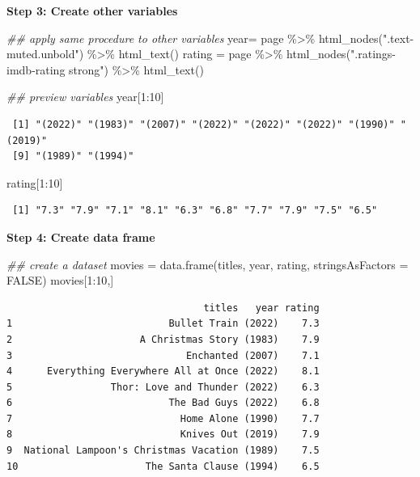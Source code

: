 \documentclass[
  letterpaper,
  DIV=11,
  numbers=noendperiod]{scrreprt}
\newenvironment{Shaded}{\begin{snugshade}}{\end{snugshade}}
\newcommand{\AttributeTok}[1]{\textcolor[rgb]{0.40,0.45,0.13}{#1}}
\newcommand{\ConstantTok}[1]{\textcolor[rgb]{0.56,0.35,0.01}{#1}}
\newcommand{\DecValTok}[1]{\textcolor[rgb]{0.68,0.00,0.00}{#1}}
\newcommand{\DocumentationTok}[1]{\textcolor[rgb]{0.37,0.37,0.37}{\textit{#1}}}
\newcommand{\FunctionTok}[1]{\textcolor[rgb]{0.28,0.35,0.67}{#1}}
\newcommand{\NormalTok}[1]{\textcolor[rgb]{0.00,0.23,0.31}{#1}}
\newcommand{\OtherTok}[1]{\textcolor[rgb]{0.00,0.23,0.31}{#1}}
\newcommand{\SpecialCharTok}[1]{\textcolor[rgb]{0.37,0.37,0.37}{#1}}
\newcommand{\StringTok}[1]{\textcolor[rgb]{0.13,0.47,0.30}{#1}}
\begin{document}
\textbf{Step 3: Create other variables}

\begin{Shaded}
\begin{Highlighting}[]
\DocumentationTok{\#\# apply same procedure to other variables}
\NormalTok{year}\OtherTok{=}\NormalTok{ page }\SpecialCharTok{\%\textgreater{}\%} \FunctionTok{html\_nodes}\NormalTok{(}\StringTok{".text{-}muted.unbold"}\NormalTok{) }\SpecialCharTok{\%\textgreater{}\%} \FunctionTok{html\_text}\NormalTok{()}
\NormalTok{rating }\OtherTok{=}\NormalTok{ page }\SpecialCharTok{\%\textgreater{}\%} \FunctionTok{html\_nodes}\NormalTok{(}\StringTok{".ratings{-}imdb{-}rating strong"}\NormalTok{) }\SpecialCharTok{\%\textgreater{}\%} \FunctionTok{html\_text}\NormalTok{()}


\DocumentationTok{\#\# preview variables}
\NormalTok{year[}\DecValTok{1}\SpecialCharTok{:}\DecValTok{10}\NormalTok{]}
\end{Highlighting}
\end{Shaded}

\begin{verbatim}
 [1] "(2022)" "(1983)" "(2007)" "(2022)" "(2022)" "(2022)" "(1990)" "(2019)"
 [9] "(1989)" "(1994)"
\end{verbatim}

\begin{Shaded}
\begin{Highlighting}[]
\NormalTok{rating[}\DecValTok{1}\SpecialCharTok{:}\DecValTok{10}\NormalTok{]}
\end{Highlighting}
\end{Shaded}

\begin{verbatim}
 [1] "7.3" "7.9" "7.1" "8.1" "6.3" "6.8" "7.7" "7.9" "7.5" "6.5"
\end{verbatim}

\textbf{Step 4: Create data frame}

\begin{Shaded}
\begin{Highlighting}[]
\DocumentationTok{\#\# create a dataset}
\NormalTok{movies }\OtherTok{=} \FunctionTok{data.frame}\NormalTok{(titles, year, rating, }\AttributeTok{stringsAsFactors =} \ConstantTok{FALSE}\NormalTok{)}
\NormalTok{movies[}\DecValTok{1}\SpecialCharTok{:}\DecValTok{10}\NormalTok{,]}
\end{Highlighting}
\end{Shaded}

\begin{verbatim}
                                  titles   year rating
1                           Bullet Train (2022)    7.3
2                      A Christmas Story (1983)    7.9
3                              Enchanted (2007)    7.1
4      Everything Everywhere All at Once (2022)    8.1
5                 Thor: Love and Thunder (2022)    6.3
6                           The Bad Guys (2022)    6.8
7                             Home Alone (1990)    7.7
8                             Knives Out (2019)    7.9
9  National Lampoon's Christmas Vacation (1989)    7.5
10                      The Santa Clause (1994)    6.5
\end{verbatim}
\end{document}

